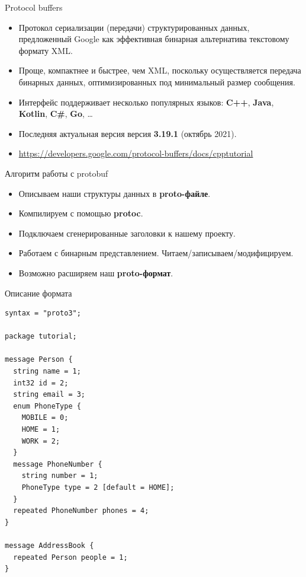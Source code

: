 \documentclass{beamer}
\begin{document}
\begin{frame}[fragile]{Protocol buffers}
    \begin{itemize}
        \item Протокол сериализации (передачи) структурированных данных, 
            предложенный Google как эффективная бинарная альтернатива текстовому формату XML. 
        \item Проще, компактнее и быстрее, чем XML, 
            поскольку осуществляется передача бинарных данных, оптимизированных под минимальный размер сообщения.
        \item Интерфейс поддерживает несколько популярных языков: {\bf C++}, {\bf Java}, {\bf Kotlin}, {\bf C#}, {\bf Go}, \dots
        \item Последняя актуальная версия версия {\bf 3.19.1} (октябрь 2021).
        \item \url{https://developers.google.com/protocol-buffers/docs/cpptutorial}
    \end{itemize}
\end{frame}

\begin{frame}[fragile]{Алгоритм работы с protobuf}
    \begin{itemize}
        \item Описываем наши структуры данных в {\bf proto-файле}.
        \item Компилируем с помощью {\bf protoc}.
        \item Подключаем сгенерированные заголовки к нашему проекту.
        \item Работаем с бинарным представлением. Читаем/записываем/модифицируем.
        \item Возможно расширяем наш {\bf proto-формат}.
    \end{itemize}
\end{frame}

\begin{frame}[fragile]{Описание формата}
    \small
    \begin{lstlisting}
syntax = "proto3";

package tutorial;

message Person {
  string name = 1;
  int32 id = 2;
  string email = 3;
  enum PhoneType {
    MOBILE = 0;
    HOME = 1;
    WORK = 2;
  }
  message PhoneNumber {
    string number = 1;
    PhoneType type = 2 [default = HOME];
  }
  repeated PhoneNumber phones = 4;
}

message AddressBook {
  repeated Person people = 1;
}
    \end{lstlisting}
\end{frame}
\end{document}

